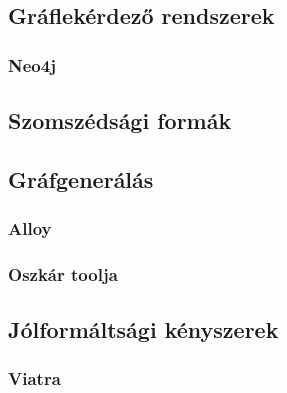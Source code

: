 \chapter*{\eloismeretek}

\section{Gráflekérdező rendszerek}
\subsection{Neo4j}

\section{Szomszédsági formák}

\section{Gráfgenerálás}

\subsection{Alloy}
\subsection{Oszkár toolja}

\section{Jólformáltsági kényszerek}

\subsection{Viatra}